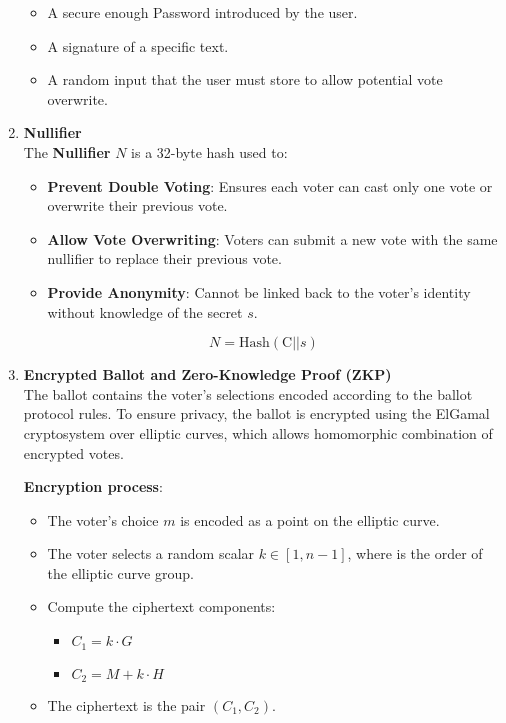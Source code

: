 \begin{enumerate}
	\begin{itemize}
		\item A secure enough Password introduced by the user.
		\item A signature of a specific text.
		\item A random input that the user must store to allow potential vote overwrite.\\
	\end{itemize}
	
	\item \textbf{Nullifier} \\
	
	The \textbf{Nullifier} $N$ is a 32-byte hash used to:
	
	\begin{itemize}
		\item \textbf{Prevent Double Voting}: Ensures each voter can cast only one vote or overwrite their previous vote.
		\item \textbf{Allow Vote Overwriting}: Voters can submit a new vote with the same nullifier to replace their previous vote.
		\item \textbf{Provide Anonymity}: Cannot be linked back to the voter's identity without knowledge of the secret $s$.
	\end{itemize}
	
	$$ N = \text{Hash}(\text{C} || s) $$ 
	
	\item \textbf{Encrypted Ballot and Zero-Knowledge Proof (ZKP)} \\
	
	The ballot contains the voter's selections encoded according to the ballot protocol rules. To ensure privacy, the ballot is encrypted using the ElGamal cryptosystem over elliptic curves, which allows homomorphic combination of encrypted votes.
	
	\textbf{Encryption process}:
	
	\begin{itemize}
		\item The voter's choice $m$ is encoded as a point on the elliptic curve.
		\item The voter selects a random scalar $k \in [1, n-1]$, where is the order of the elliptic curve group.
		\item Compute the ciphertext components:
		\begin{itemize}
			\item $C_1 = k \cdot G$
			\item $C_2 = M + k \cdot H$
		\end{itemize}
		\item The ciphertext is the pair $(C_1, C_2)$.
	\end{itemize}
	

\end{enumerate}
